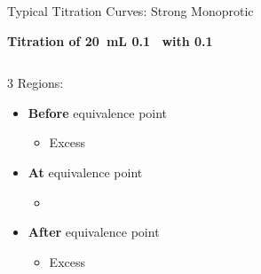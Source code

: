 \documentclass[notes=hide]{beamer}
\begin{document}
\begin{frame}[t]{Typical Titration Curves: Strong Monoprotic}
	\begin{center}
		\bfseries
		Titration of \SI{20}{\milli\liter} \SI{0.1}{\Molar}~
		with \SI{0.1}{\Molar}~
	\end{center}

	\begin{columns}[t]
		
		\begin{block}{3 Regions:}
			\begin{itemize}
				\item \textbf{Before} equivalence point
					\begin{itemize}
						\item<2-> Excess 
					\end{itemize}
				\item \textbf{At} equivalence point
					\begin{itemize}
						\item<3-> \ch{[NaOH] = [HCl]}
					\end{itemize}
				\item \textbf{After} equivalence point
					\begin{itemize}
						\item<4-> Excess 
					\end{itemize}
			\end{itemize}
		\end{block}
	\end{columns}
\end{frame}
\end{document}
